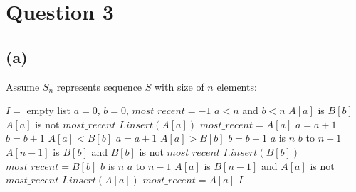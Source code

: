 
\section{Question 3}
    \begin{spacing}{1.2}
    \subsection{(a)} 
        Assume $S_n$ represents sequence $S$ with size of $n$ elements:
        \begin{codebox}
            \li $I =$ empty list
            \li $a = 0$, $b = 0$, $most\_recent = -1$
            \li \While $a < n$ and $b<n$
                \Do
                    \li \If $A[a]$ is $B[b]$
                    \Then
                        \li \If $A[a]$ is not $most\_recent$
                        \Then
                            \li $I.insert(A[a])$
                            \li $most\_recent = A[a]$
                        \End
                        \li $a = a + 1$
                        \li $b = b + 1$
                    \li \ElseIf $A[a] < B[b]$
                    \Then
                        \li $a = a + 1$
                    \li \ElseIf $A[a] > B[b]$
                    \Then
                        \li $b = b + 1$
                    \End 
                \End
            \li \If $a$ is $n$
            \Then
                \li \For $b$ to $n-1$
                \Then
                    \li \If $A[n-1]$ is $B[b]$ and $B[b]$ is not $most\_recent$
                    \Then
                        \li $I.insert(B[b])$
                        \li $most\_recent = B[b]$
                    \End
                \End
            \li \ElseIf $b$ is $n$
            \Then
                \li \For $a$ to $n-1$
                \Then
                    \li \If $A[a]$ is $B[n-1]$ and $A[a]$ is not $most\_recent$
                    \Then
                        \li $I.insert(A[a])$
                        \li $most\_recent = A[a]$
                    \End
                \End
            \End
            \li \Return $I$
        \end{codebox}
    \end{spacing}
    
